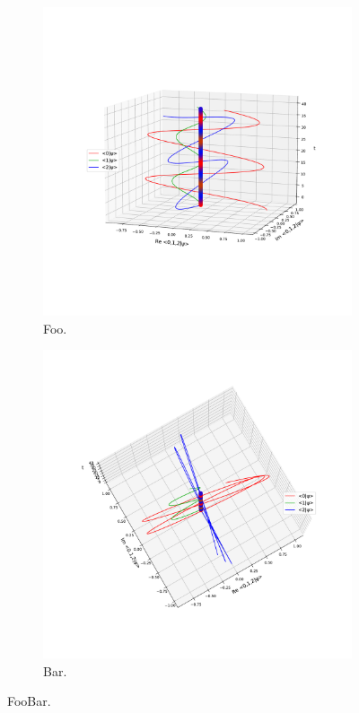\begin{figure}[h]
  \begin{subfigure}[b]{\textwidth}
    \centering
    \includegraphics[height=0.45\textheight,clip,trim=80 180 40 140]{img/3ldetect/hermitianSpaceTime_side.pdf}
    \caption{Foo.}
  \end{subfigure}
  \par\bigskip
  \begin{subfigure}[b]{\textwidth}
    \centering
    \includegraphics[height=0.41\textheight,clip,trim= 20 120 20 220]{img/3ldetect/hermitianSpaceTime_top.pdf}
    \caption{Bar.}
  \end{subfigure}
  \caption{FooBar.}
\end{figure}


